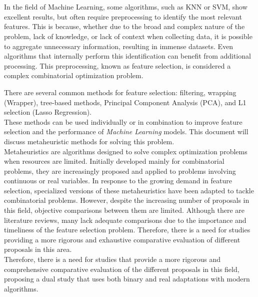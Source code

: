 \\

\vspace{0.7cm}
\\

In the field of Machine Learning, some algorithms, such as KNN or SVM, show excellent results, but often require preprocessing to identify the most relevant features. This is because, whether due to the broad and complex nature of the problem, lack of knowledge, or lack of context when collecting data, it is possible to aggregate unnecessary information, resulting in immense datasets. Even algorithms that internally perform this identification can benefit from additional processing. This preprocessing, known as feature selection, is considered a complex combinatorial optimization problem.

There are several common methods for feature selection: filtering, wrapping (Wrapper), tree-based methods, Principal Component Analysis (PCA), and L1 selection (Lasso Regression).\\[6pt]

These methods can be used individually or in combination to improve feature selection and the performance of \textit{Machine Learning} models. This document will discuss metaheuristic methods for solving this problem.\\[6pt]

Metaheuristics are algorithms designed to solve complex optimization problems when resources are limited. Initially developed mainly for combinatorial problems, they are increasingly proposed and applied to problems involving continuous or real variables. In response to the growing demand in feature selection, specialized versions of these metaheuristics have been adapted to tackle combinatorial problems. However, despite the increasing number of proposals in this field, objective comparisons between them are limited. Although there are literature reviews, many lack adequate comparisons due to the importance and timeliness of the feature selection problem. Therefore, there is a need for studies providing a more rigorous and exhaustive comparative evaluation of different proposals in this area.\\[6pt]

Therefore, there is a need for studies that provide a more rigorous and comprehensive comparative evaluation of the different proposals in this field, proposing a dual study that uses both binary and real adaptations with modern algorithms.\\[6pt]

